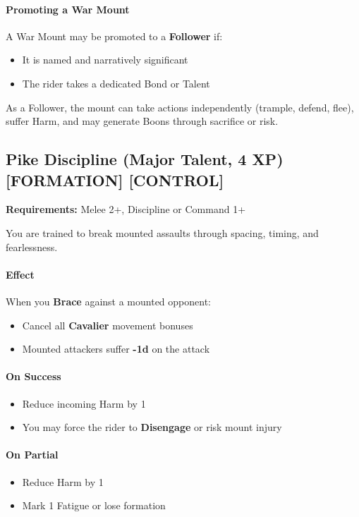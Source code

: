 \paragraph{Promoting a War Mount}
A War Mount may be promoted to a \textbf{Follower} if:
\begin{itemize}
  \item It is named and narratively significant
  \item The rider takes a dedicated Bond or Talent
\end{itemize}
As a Follower, the mount can take actions independently (trample, defend, flee), suffer Harm, and may generate Boons through sacrifice or risk.

\subsection*{Pike Discipline (Major Talent, 4 XP) \textnormal{[FORMATION] [CONTROL]}}

\textbf{Requirements:} Melee 2+, Discipline or Command 1+

You are trained to break mounted assaults through spacing, timing, and fearlessness.

\paragraph{Effect}
When you \textbf{Brace} against a mounted opponent:
\begin{itemize}
  \item Cancel all \textbf{Cavalier} movement bonuses
  \item Mounted attackers suffer \textbf{-1d} on the attack
\end{itemize}

\paragraph{On Success}
\begin{itemize}
  \item Reduce incoming Harm by 1
  \item You may force the rider to \textbf{Disengage} or risk mount injury
\end{itemize}

\paragraph{On Partial}
\begin{itemize}
  \item Reduce Harm by 1
  \item Mark 1 Fatigue or lose formation
\end{itemize}

